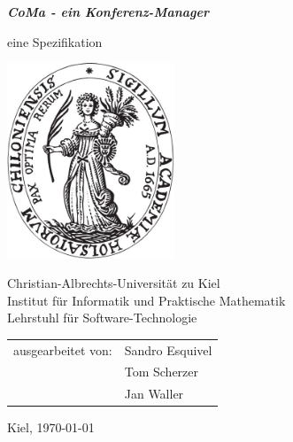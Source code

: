 \documentclass[headexclude,footexclude,12pt,BCOR0pt,DIV15]{scrartcl}
\begin{document}
\thispagestyle{empty}
\begin{center}
{\huge \bf \emph{CoMa - ein Konferenz-Manager}}

\vspace{2cm}

{\Large eine Spezifikation}

\vspace{2.25cm}

\includegraphics[width=5cm]{CAU-Siegel}

\vspace{2.25cm}

{\large
{\sc Christian-Albrechts-Universit\"{a}t zu Kiel} \\
Institut f\"{u}r Informatik und Praktische Mathematik \\
Lehrstuhl f\"{u}r Software-Technologie }

\vspace{2cm}

\begin{tabular}{ll}
ausgearbeitet von:           & {Sandro Esquivel} \\
                             & {Tom Scherzer} \\
                             & {Jan Waller} \\
\end{tabular}

\vspace{1cm}

Kiel, \today
\end{center}

\pagebreak
\thispagestyle{plain}  \setcounter{page}{1}
\tableofcontents
\end{document}
